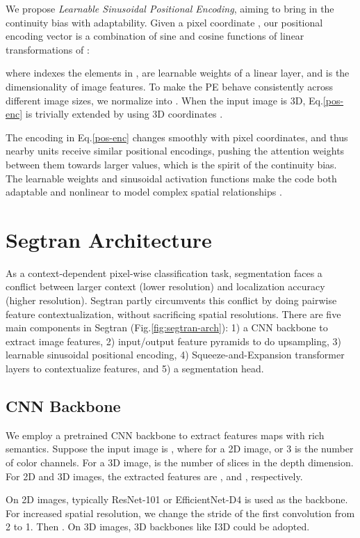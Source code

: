 \documentclass{article}
\begin{document}
We propose \emph{Learnable Sinusoidal Positional Encoding}, aiming to bring in the continuity bias with adaptability. 
Given a pixel coordinate , our positional encoding vector  is a combination of sine and cosine functions of linear transformations of :

where  indexes the elements in ,  are learnable weights of a linear layer, and  is the dimensionality of image features. To make the PE behave consistently across different image sizes, we normalize  into . When the input image is 3D, Eq.\eqref{pos-enc} is trivially extended by using 3D coordinates .

The encoding in Eq.\eqref{pos-enc} changes smoothly with pixel coordinates, and thus nearby units receive similar positional encodings, pushing the attention weights between them towards larger values, which is the spirit of the continuity bias. The learnable weights and sinusoidal activation functions make the code both adaptable and nonlinear to model complex spatial relationships \cite{fourier}. 

\section{Segtran Architecture}
As a context-dependent pixel-wise classification task, segmentation faces a conflict between larger context (lower resolution) and localization accuracy (higher resolution). Segtran partly circumvents this conflict by doing pairwise feature contextualization, without sacrificing spatial resolutions. 
There are five main components in Segtran (Fig.\ref{fig:segtran-arch}): 1) a CNN backbone to extract image features, 2) input/output feature pyramids to do upsampling, 3) learnable sinusoidal positional encoding, 4) Squeeze-and-Expansion transformer layers to contextualize features, and 5) a segmentation head.

\subsection{CNN Backbone} \label{backbone}
We employ a pretrained CNN backbone to extract features maps with rich semantics. Suppose the input image is ,  where for a 2D image,  or 3 is the number of color channels. For a 3D image,  is the number of slices in the depth dimension. For 2D and 3D images, the extracted features are , and , respectively.

On 2D images, typically ResNet-101 or EfficientNet-D4 is used as the backbone. For increased spatial resolution, we change the stride of the first convolution from 2 to 1. Then . On 3D images, 3D backbones like I3D \cite{i3d} could be adopted.
\end{document}
